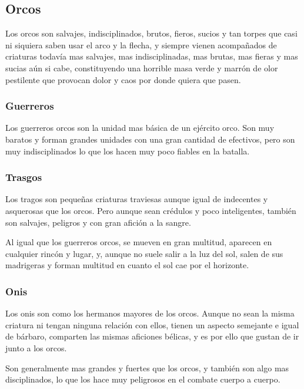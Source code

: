 \subsection*{Orcos}
Los orcos son salvajes, indisciplinados, brutos, fieros, sucios y
tan torpes que casi ni siquiera saben usar el arco y la flecha, y
siempre vienen acompañados de criaturas todavía mas salvajes, mas
indisciplinadas, mas brutas, mas fieras y mas sucias aún si cabe,
constituyendo una horrible masa verde y marrón de olor pestilente que
provocan dolor y caos por donde quiera que pasen.

\subsubsection*{Guerreros}
Los guerreros orcos son la unidad mas básica de un ejército orco. Son
muy baratos y forman grandes unidades con una gran cantidad de
efectivos, pero son muy indisciplinados lo que los hacen muy poco
fiables en la batalla.


\subsubsection*{Trasgos}
Los tragos son pequeñas criaturas traviesas aunque igual de indecentes
y asquerosas que los orcos. Pero aunque sean crédulos y poco
inteligentes, también son salvajes, peligros y con gran afición a la
sangre.

Al igual que los guerreros orcos, se mueven en gran multitud, aparecen
en cualquier rincón y lugar, y, aunque no suele salir a la luz del
sol, salen de sus madrigeras y forman multitud en cuanto el sol cae
por el horizonte.


\subsubsection*{Onis}
Los onis son como los hermanos mayores de los orcos. Aunque no
sean la misma criatura ni tengan ninguna relación con ellos, tienen un
aspecto semejante e igual de bárbaro, comparten las mismas aficiones
bélicas, y es por ello que gustan de ir junto a los orcos.

Son generalmente mas grandes y fuertes que los orcos, y también son
algo mas disciplinados, lo que los hace muy peligrosos en el combate
cuerpo a cuerpo.


